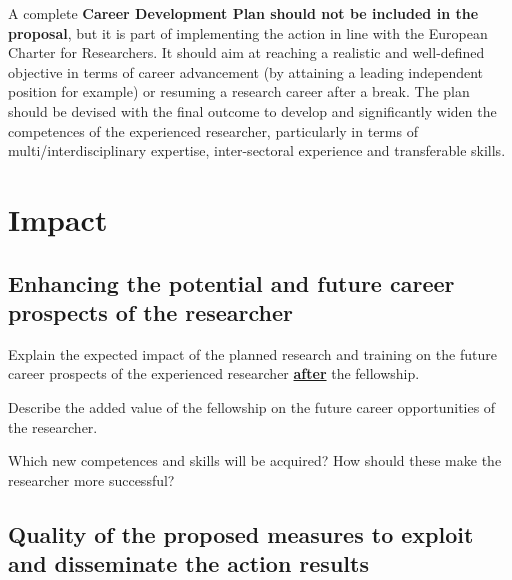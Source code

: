 \medskip\noindent
A complete {\bf Career Development Plan should not be included in the proposal}, 
but it is part of implementing the action in line with the European Charter for Researchers. It
should aim at reaching a realistic and well-defined objective in terms of career
advancement (by attaining a leading independent position for example) or resuming a
research career after a break. The plan should be devised with the final outcome to
develop and significantly widen the competences of the experienced researcher,
particularly in terms of multi/interdisciplinary expertise, inter-sectoral experience and
transferable skills.




\newpage
\section{Impact}
\label{sec:impact}

\subsection{Enhancing the potential and future career prospects of the researcher}
\label{sec:impact_researcher}

Explain the expected impact of the planned research and training on the future career prospects of the experienced researcher \ul{\textbf{after}} the fellowship.

\medskip\noindent
Describe the added value of the fellowship on the future career opportunities of the
researcher.

\medskip\noindent
Which new competences and skills will be acquired? How should these make the
researcher more successful?




\subsection{Quality of the proposed measures to exploit and disseminate the action results}
\label{sec:impact_dissemination}

